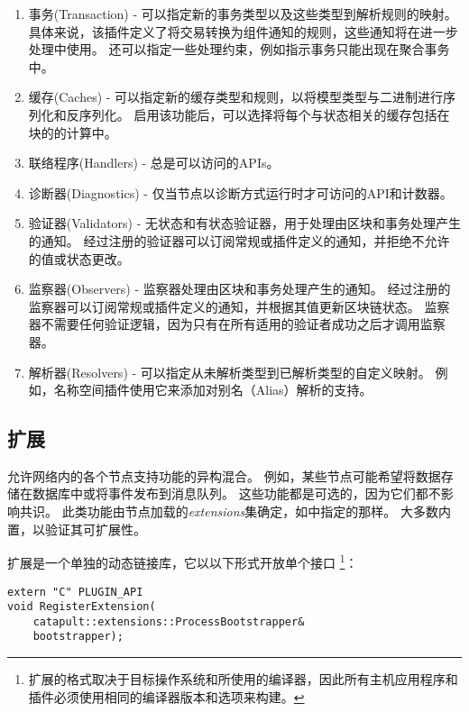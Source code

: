 \begin{enumerate}
	\item{事务(Transaction) -
		可以指定新的事务类型以及这些类型到解析规则的映射。
		具体来说，该插件定义了将交易转换为组件通知的规则，这些通知将在进一步处理中使用。
		还可以指定一些处理约束，例如指示事务只能出现在聚合事务中。
	}
	\item{缓存(Caches) -
		可以指定新的缓存类型和规则，以将模型类型与二进制进行序列化和反序列化。
		启用该功能后，可以选择将每个与状态相关的缓存包括在块的的计算中。
	}
	\item{联络程序(Handlers) - 总是可以访问的APIs。}
	\item{诊断器(Diagnostics) - 仅当节点以诊断方式运行时才可访问的API和计数器。}
	\item{验证器(Validators) -
		无状态和有状态验证器，用于处理由区块和事务处理产生的通知。
		经过注册的验证器可以订阅常规或插件定义的通知，并拒绝不允许的值或状态更改。	
	}
	\item{监察器(Observers) -
		监察器处理由区块和事务处理产生的通知。
		经过注册的监察器可以订阅常规或插件定义的通知，并根据其值更新区块链状态。
		监察器不需要任何验证逻辑，因为只有在所有适用的验证者成功之后才调用监察器。
	}
	\item{解析器(Resolvers) -
		可以指定从未解析类型到已解析类型的自定义映射。
		例如，名称空间插件使用它来添加对别名（Alias）解析的支持。
	}
\end{enumerate}

\subsection{\codenamespace 扩展}
\label{sec:system:extensions}

允许网络内的各个节点支持功能的异构混合。
例如，某些节点可能希望将数据存储在数据库中或将事件发布到消息队列。
这些功能都是可选的，因为它们都不影响共识。
此类功能由节点加载的\textit{extensions}集确定，如中指定的那样。
大多数内置，以验证其可扩展性。

扩展是一个单独的动态链接库，它以以下形式开放单个接口
\footnote{扩展的格式取决于目标操作系统和所使用的编译器，因此所有主机应用程序和插件必须使用相同的编译器版本和选项来构建。}：

\begin{lstlisting}
extern "C" PLUGIN_API
void RegisterExtension(
	catapult::extensions::ProcessBootstrapper& 
	bootstrapper);
\end{lstlisting}

